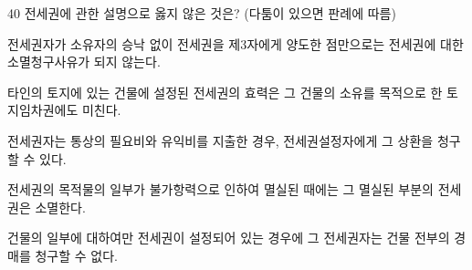 \begin{question}{40}
전세권에 관한 설명으로 옳지 않은 것은? (다툼이 있으면 판례에 따름)
\begin{choices}
  \item 전세권자가 소유자의 승낙 없이 전세권을 제3자에게 양도한 점만으로는 전세권에 대한 소멸청구사유가 되지 않는다.
  \item 타인의 토지에 있는 건물에 설정된 전세권의 효력은 그 건물의 소유를 목적으로 한 토지임차권에도 미친다.
  \item 전세권자는 통상의 필요비와 유익비를 지출한 경우, 전세권설정자에게 그 상환을 청구할 수 있다.
  \item 전세권의 목적물의 일부가 불가항력으로 인하여 멸실된 때에는 그 멸실된 부분의 전세권은 소멸한다.
  \item 건물의 일부에 대하여만 전세권이 설정되어 있는 경우에 그 전세권자는 건물 전부의 경매를 청구할 수 없다.
\end{choices}
\end{question}
